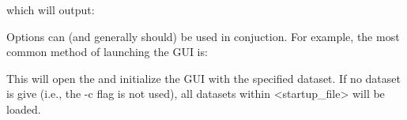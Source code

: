 \documentclass[letterpaper,10pt,english]{sphinxmanual}
\begin{document}
\begin{sphinxVerbatim}[commandchars=\\\{\}]
 
\end{sphinxVerbatim}

which will output:

\begin{sphinxVerbatim}[commandchars=\\\{\}]
 
       
            
          
              
              
                 
\end{sphinxVerbatim}

Options can (and generally should) be used in conjuction.
For example, the most common method of launching the GUI is:

\begin{sphinxVerbatim}[commandchars=\\\{\}]
    
\end{sphinxVerbatim}

This will open the {\hyperref[\detokenize{content/api_core/input_files:startup-file}]{}} and initialize the GUI with the specified dataset. If no dataset is give (i.e., the -c flag is not used), all datasets within \textless{}startup\_file\textgreater{} will be loaded.
\end{document}
